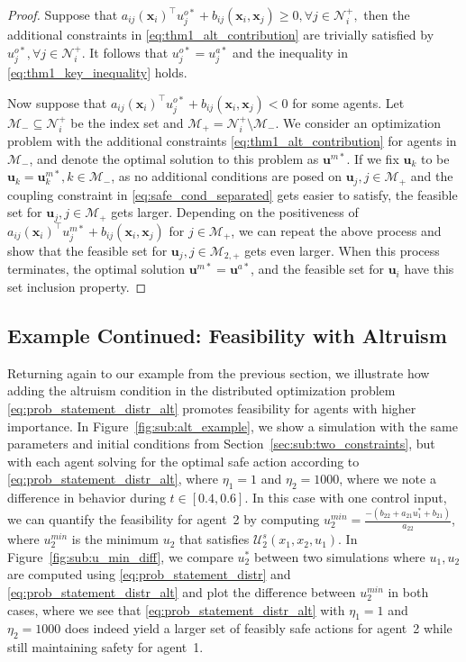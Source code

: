 \documentclass[letterpaper, 10 pt, conference]{ieeeconf}  %
\theoremstyle{plain}
\begin{document}
\begin{proof}
    
    Suppose that $a_{ij}(\mathbf{x}_i)^\top u_j^{o*} + b_{ij}(\mathbf{x}_i,\mathbf{x}_j)  \geq 0, \forall j \in  \mathcal{N}_i^+, $ then the additional constraints in \eqref{eq:thm1_alt_contribution} are trivially satisfied by $u_j^{o*}, \forall j \in  \mathcal{N}_i^+$. It follows that $ u_j^{o*} =  u_j^{a*}$ and the inequality in \eqref{eq:thm1_key_inequality} holds. 

    Now suppose that $a_{ij}(\mathbf{x}_i)^\top u_j^{o*} + b_{ij}(\mathbf{x}_i,\mathbf{x}_j)  <  0$ for some  agents. Let $\mathcal{M}_{-}\subseteq  \mathcal{N}_i^+$ be the index set and $\mathcal{M}_{+} = \mathcal{N}_i^+ \setminus \mathcal{M}_{-} $. We consider an optimization problem with the additional constraints \eqref{eq:thm1_alt_contribution} for agents in  $\mathcal{M}_{-}$, and denote the optimal solution to this problem as $\mathbf{u}^{m*}$. If we fix $\mathbf{u}_k$ to be $ \mathbf{u}_k= \mathbf{u}_k^{m*}, k \in \mathcal{M}_{-}$, as no additional conditions are posed on  $\mathbf{u}_{j}, j\in \mathcal{M}_{+}$ and the coupling constraint in \eqref{eq:safe_cond_separated} gets easier to satisfy, the feasible set for $\mathbf{u}_{j}, j\in \mathcal{M}_{+}$ gets larger. Depending on the positiveness of $a_{ij}(\mathbf{x}_i)^\top u_j^{m*} + b_{ij}(\mathbf{x}_i,\mathbf{x}_j) $ for $j\in \mathcal{M}_{+}$, we can repeat the above process and show that the feasible set for $\mathbf{u}_{j}, j\in \mathcal{M}_{2,+}$ gets even larger. When this process terminates, the optimal solution $\mathbf{u}^{m*} = \mathbf{u}^{a*}$, and the feasible set for $\mathbf{u}_{i}$ have this set inclusion property. 
\end{proof}

\subsection{\textbf{Example Continued:} Feasibility with Altruism}
Returning again to our example from the previous section, we illustrate how adding the altruism condition in the distributed optimization problem \eqref{eq:prob_statement_distr_alt} promotes feasibility for agents with higher importance. In Figure~\ref{fig:sub:alt_example}, we show a simulation with the same parameters and initial conditions from Section~\ref{sec:sub:two_constraints}, but with each agent solving for the optimal safe action according to \eqref{eq:prob_statement_distr_alt}, where $\eta_1 = 1$ and $\eta_2 = 1000$, where we note a difference in behavior during $t \in  [0.4, 0.6]$. In this case with one control input, we can quantify the feasibility for agent~2 by computing $u_{2}^{min} = \frac{-(b_{22} + a_{21}u_1^*+b_{21})}{a_{22}}$, where $u_{2}^{min}$ is the minimum $u_2$ that satisfies $\mathcal{U}_2^s(x_1, x_2, u_1)$. In Figure~\ref{fig:sub:u_min_diff}, we compare $u_{2}^*$ between two simulations where $u_1, u_2$ are computed using \eqref{eq:prob_statement_distr} and \eqref{eq:prob_statement_distr_alt} and plot the difference between $u_{2}^{min}$ in both cases, where we see that \eqref{eq:prob_statement_distr_alt} with $\eta_1 = 1$ and $\eta_2 = 1000$ does indeed yield a larger set of feasibly safe actions for agent~2 while still maintaining safety for agent~1.
\end{document}
